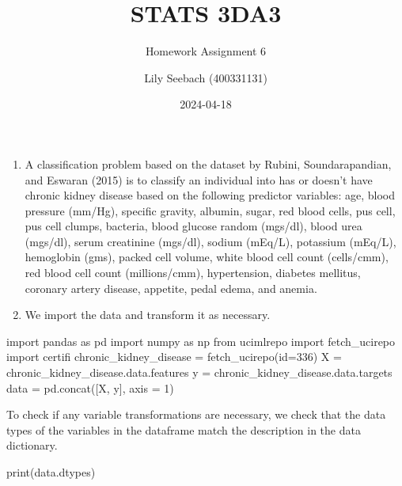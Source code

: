 \documentclass[
  11pt,
  letterpaper,
  DIV=11,
  numbers=noendperiod]{scrartcl}
\title{STATS 3DA3}
\subtitle{Homework Assignment 6}
\author{Lily Seebach (400331131)}
\date{2024-04-18}
\newenvironment{Shaded}{\begin{snugshade}}{\end{snugshade}}
\newcommand{\BuiltInTok}[1]{\textcolor[rgb]{0.00,0.23,0.31}{#1}}
\newcommand{\DecValTok}[1]{\textcolor[rgb]{0.68,0.00,0.00}{#1}}
\newcommand{\ImportTok}[1]{\textcolor[rgb]{0.00,0.46,0.62}{#1}}
\newcommand{\NormalTok}[1]{\textcolor[rgb]{0.00,0.23,0.31}{#1}}
\newcommand{\OperatorTok}[1]{\textcolor[rgb]{0.37,0.37,0.37}{#1}}
\begin{document}
\maketitle

\newpage

\begin{enumerate}
\def\labelenumi{\arabic{enumi}.}
\item
  A classification problem based on the dataset by Rubini,
  Soundarapandian, and Eswaran (2015) is to classify an individual into
  has or doesn't have chronic kidney disease based on the following
  predictor variables: age, blood pressure (mm/Hg), specific gravity,
  albumin, sugar, red blood cells, pus cell, pus cell clumps, bacteria,
  blood glucose random (mgs/dl), blood urea (mgs/dl), serum creatinine
  (mgs/dl), sodium (mEq/L), potassium (mEq/L), hemoglobin (gms), packed
  cell volume, white blood cell count (cells/cmm), red blood cell count
  (millions/cmm), hypertension, diabetes mellitus, coronary artery
  disease, appetite, pedal edema, and anemia.
\item
  We import the data and transform it as necessary.
\end{enumerate}

\begin{Shaded}
\begin{Highlighting}[]
\ImportTok{import}\NormalTok{ pandas }\ImportTok{as}\NormalTok{ pd}
\ImportTok{import}\NormalTok{ numpy }\ImportTok{as}\NormalTok{ np}
\ImportTok{from}\NormalTok{ ucimlrepo }\ImportTok{import}\NormalTok{ fetch\_ucirepo }
\ImportTok{import}\NormalTok{ certifi}
\NormalTok{chronic\_kidney\_disease }\OperatorTok{=}\NormalTok{ fetch\_ucirepo(}\BuiltInTok{id}\OperatorTok{=}\DecValTok{336}\NormalTok{) }
\NormalTok{X }\OperatorTok{=}\NormalTok{ chronic\_kidney\_disease.data.features }
\NormalTok{y }\OperatorTok{=}\NormalTok{ chronic\_kidney\_disease.data.targets}
\NormalTok{data }\OperatorTok{=}\NormalTok{ pd.concat([X, y], axis }\OperatorTok{=} \DecValTok{1}\NormalTok{)}
\end{Highlighting}
\end{Shaded}

To check if any variable transformations are necessary, we check that
the data types of the variables in the dataframe match the description
in the data dictionary.

\begin{Shaded}
\begin{Highlighting}[]
\BuiltInTok{print}\NormalTok{(data.dtypes)}
\end{Highlighting}
\end{Shaded}
\end{document}
